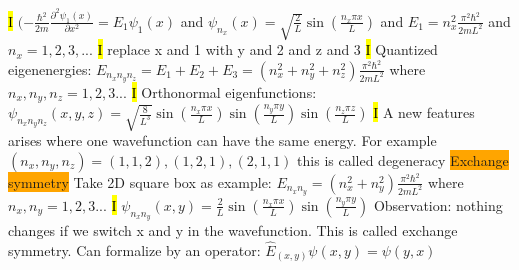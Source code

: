 \documentclass[fontsize=4pt]{scrartcl}
\begin{document}
\hl{I}
$(-\frac{\hbar^2}{2m} \frac{\partial^2 \psi_1(x)}{\partial x^2} = E_1 \psi_1(x) $ and $\psi_{n_{x}}(x) = \sqrt{\frac{2}{L}}\sin(\frac{n_x \pi x}{L})$ and $E_1 = n_x^2\frac{\pi^2 \hbar^2}{2mL^2}$ and $n_x =1,2,3,...$
\hl{I} replace x and 1 with y and 2 and z and 3
\hl{I}
Quantized eigenenergies: $E_{n_x n_y n_z} = E_1 + E_2 + E_3 = (n_x^2 + n_y^2 + n_z^2)\frac{\pi^2 \hbar^2}{2mL^2}$ where $n_x, n_y, n_z = 1,2,3...$
\hl{I}
Orthonormal eigenfunctions: $\psi_{n_x n_y n_z}(x,y,z) = \sqrt{\frac{8}{L^3}} \sin(\frac{n_x \pi x}{L}) \sin(\frac{n_y \pi y}{L}) \sin(\frac{n_z \pi z}{L})$ 
\hl{I}
A new features arises where one wavefunction can have the same energy. For example $(n_x, n_y, n_z) = (1,1,2), (1,2,1), (2,1,1)$ this is called degeneracy
\colorbox{Orange}{Exchange symmetry}
Take 2D square box as example:
$E_{n_{x} n_{y}}=(n_x^2 + n_y^2)\frac{\pi^2 \hbar^2}{2m L^2}$ where $n_x , n_y = 1,2,3...$
\hl{I}
$\psi_{n_x n_y}(x,y) = \frac{2}{L} \sin(\frac{n_x \pi x}{L}) \sin(\frac{n_y \pi y}{L})$
Observation: nothing changes if we switch x and y in the wavefunction. This is called exchange symmetry. Can formalize by an operator: $\hat{E}_{(x,y)} \psi(x,y) = \psi(y,x)$
\end{document}
